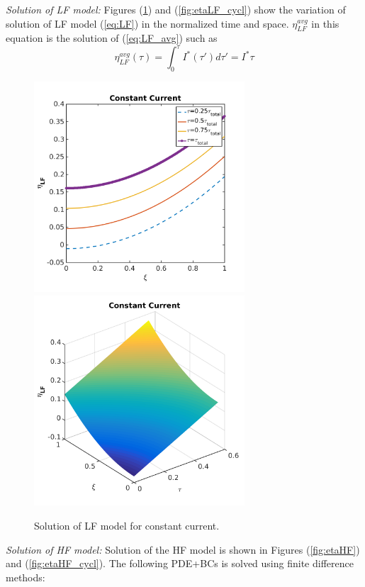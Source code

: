 \documentclass[]{article}
\begin{document}
\textit{Solution of LF model:}
Figures (\ref{fig:etaLF}) and (\ref{fig:etaLF_cycl}) show the variation of solution of LF model (\ref{eq:LF}) in the normalized time and space. $\eta_{LF}^{avg}$ in this equation is the solution of (\ref{eq:LF_avg}) such as
%
\begin{equation}\label{eq:Iprim}
{\eta_{LF}^{avg}}(\tau) = \int_0^{\tau} I^*(\tau') d\tau' 
 = I^* \tau
\end{equation}
\begin{figure}[h]
    \centering
    \includegraphics[trim = 0in 0in 0in 0in, clip, width=0.7\textwidth]{figures/etaLF2d.png}
    \\
    \includegraphics[trim = 0in 0in 0in 0in, clip, width=0.7\textwidth]{figures/etaLF3d.png}      
    \caption{Solution of LF model for constant current.}
    \label{fig:etaLF}
\end{figure}
%
\textit{Solution of HF model:}
Solution of the HF model is shown in Figures (\ref{fig:etaHF}) and (\ref{fig:etaHF_cycl}). The following PDE+BCs is solved using finite difference methods:
\end{document}
